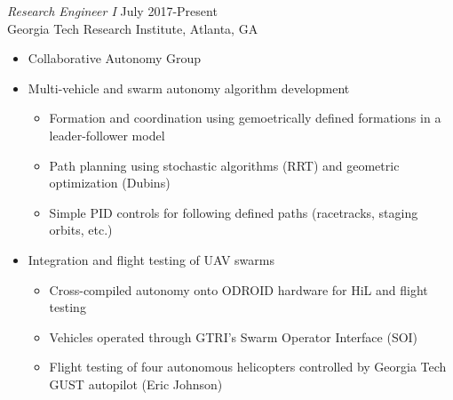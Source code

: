 \documentclass[margin]{resume} %
\begin{document}
\begin{resume}
{\sl Research Engineer I} \hfill July 2017-Present \\
Georgia Tech Research Institute, Atlanta, GA
\begin{itemize} \itemsep -2pt %
\item Collaborative Autonomy Group
\item Multi-vehicle and swarm autonomy algorithm development
\vspace{-2mm}
	\begin{itemize}
	\item Formation and coordination using gemoetrically defined formations in a leader-follower model
	\item Path planning using stochastic algorithms (RRT) and geometric optimization (Dubins)
	\item Simple PID controls for following defined paths (racetracks, staging orbits, etc.)
	\end{itemize}
\item Integration and flight testing of UAV swarms 
\vspace{-2mm}
	\begin{itemize}
	\item Cross-compiled autonomy onto ODROID hardware for HiL and flight testing
	\item Vehicles operated through GTRI's Swarm Operator Interface (SOI)
	\item Flight testing of four autonomous helicopters controlled by Georgia Tech GUST autopilot (Eric Johnson) 
	\end{itemize}
\end{itemize} 


\end{resume}
\end{document}
